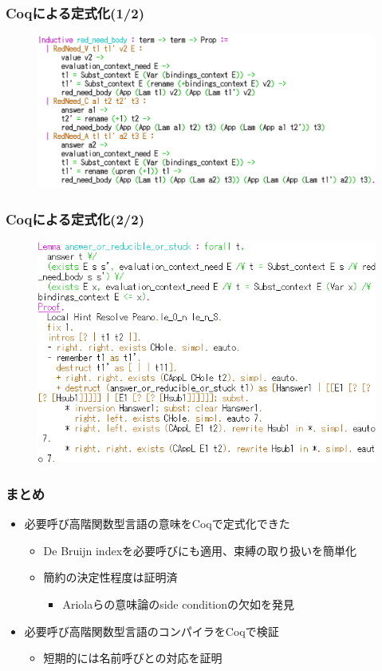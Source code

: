 \documentclass[dvipdfmx,cjk,xcolor=dvipsnames,envcountsect,notheorems,12pt]{beamer}
\theoremstyle{definition}
\begin{document}
\begin{frame}
	\frametitle{Coqによる定式化(1/2)}
	\begin{figure}
		\centering
		\includegraphics[width=\textwidth]{./red_def.png}
	\end{figure}
\end{frame}

\begin{frame}
	\frametitle{Coqによる定式化(2/2)}
	\begin{figure}
		\centering
		\includegraphics[width=\textwidth]{./red_det.png}
	\end{figure}
\end{frame}

\begin{frame}
	\frametitle{まとめ}
	\begin{itemize}
		\item 必要呼び高階関数型言語の意味をCoqで定式化できた
			\begin{itemize}
				\item De Bruijn indexを必要呼びにも適用、束縛の取り扱いを簡単化
				\item 簡約の決定性程度は証明済
					\begin{itemize}
						\item Ariolaらの意味論のside conditionの欠如を発見
					\end{itemize}
			\end{itemize}
		\item 必要呼び高階関数型言語のコンパイラをCoqで検証
			\begin{itemize}
				\item 短期的には名前呼びとの対応を証明
			\end{itemize}
	\end{itemize}
\end{frame}
\end{document}
